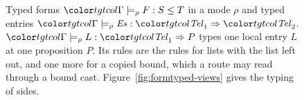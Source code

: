 \begin{figure}
\color{black}
\caption{Typed forms $\chainj{\Gamma}{\rho}{F}{S}{T}$ in a mode $\rho$ and typed entries $\entjm{\Gamma}{\rho}{\mathit{Es}}{\tel_1}{\tel_2}$. $\entjm{\Gamma}{\rho}{L}{\tel_1}{P}$ types one local entry $L$ at one proposition $P$. Its rules are the rules for lists with the list left out, and one more for a copied bound, which a route may read through a bound cast. Figure~\ref{fig:formtyped-views} gives the typing of sides.}
\label{fig:formtyped}
\end{figure}

